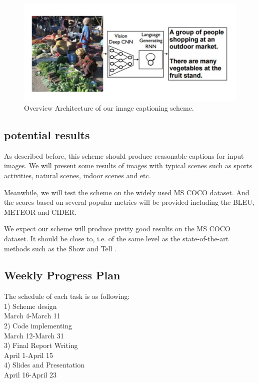 \documentclass[conference]{IEEEtran}
\begin{document}
\begin{figure}
  \centering
  \includegraphics[width=1.0\linewidth]{figures/framework.pdf}
  \caption{Overview Architecture of our image captioning scheme.}\label{framework_fig}
\end{figure}

\subsection{potential results}

As described before, this scheme should produce reasonable captions for input images. We will present some results of images with typical scenes such as sports activities, natural scenes, indoor scenes and etc.
 
Meanwhile, we will test the scheme on the widely used MS COCO dataset. And the scores based on several popular metrics will be provided including the BLEU, METEOR and CIDER. 

We expect our scheme will produce pretty good results on the MS COCO dataset. It should be close to, i.e. of the same level as the state-of-the-art methods such as the Show and Tell \cite{vinyals2015show}.

\subsection{Weekly Progress Plan}
The schedule of each task is as following:
\\1) Scheme design
\\March 4-March 11
\\2) Code implementing
\\March 12-March 31
\\3) Final Report Writing
\\April 1-April 15
\\4) Slides and Presentation
\\April 16-April 23




\end{document}
